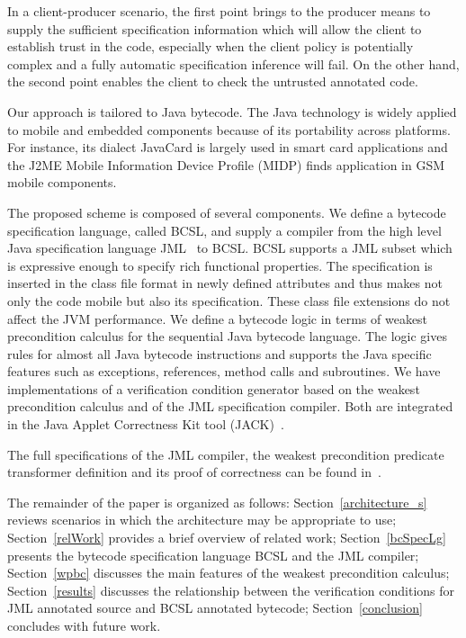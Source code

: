 In a client-producer scenario, the first point brings to the producer means to supply the sufficient specification information 
which will allow the client to establish trust in the code, especially when the client policy is potentially complex and a fully automatic specification inference
will fail. On the other hand, the second point enables the client to check the untrusted annotated code. 

  

Our approach is tailored to Java bytecode.
The Java technology is widely applied to mobile and embedded components because of its portability across platforms. 
For instance, its dialect JavaCard is largely used in smart card applications and the J2ME Mobile Information Device Profile 
(MIDP) finds application in GSM mobile components. 

The proposed scheme is composed of several components.
 We define a bytecode specification language, called BCSL, and supply a compiler from 
 the high level Java specification language JML~\cite{JMLRefMan} to BCSL. 
 BCSL supports a JML subset which is expressive enough to specify rich functional properties. 
The specification is inserted in the class file format in newly defined attributes and thus makes not
 only the code mobile but also its specification. These class
 file extensions do not affect the JVM performance.
We define a bytecode logic in terms of weakest precondition calculus for the sequential Java bytecode language. 
The logic gives rules for almost all Java bytecode instructions and supports the Java specific features such as
exceptions, references, method calls and subroutines.  
 We have implementations of a verification condition generator based on the weakest precondition calculus and of
 the JML specification compiler. Both are integrated in the Java Applet Correctness Kit tool (JACK)~\cite{BRL-JACK}.

 
 The full specifications of the JML compiler, the weakest precondition predicate transformer definition and its proof of correctness can be found in~\cite{JBL05MP}.
  
The remainder of the paper is organized as follows: 
Section~\ref{architecture_s} reviews scenarios in which the architecture may be appropriate to use; 
Section~\ref{relWork} provides a brief overview of related work;
 Section~\ref{bcSpecLg} presents the bytecode specification language BCSL and the JML compiler; Section~\ref{wpbc} discusses the main
features of the weakest precondition calculus; Section~\ref{results} discusses the relationship between the verification conditions for JML annotated source and BCSL annotated bytecode; Section~\ref{conclusion} concludes with future work.  















